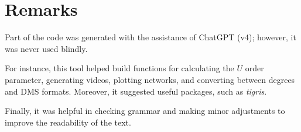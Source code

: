 \chapter*{Remarks}
Part of the code was generated with the assistance of ChatGPT (v4); however, it was never used blindly. 

For instance, this tool helped build functions for calculating the \( U \) order parameter, generating videos, plotting networks, and converting between degrees and DMS formats. Moreover, it suggested useful packages, such as \textsl{tigris}. 

Finally, it was helpful in checking grammar and making minor adjustments to improve the readability of the text.
